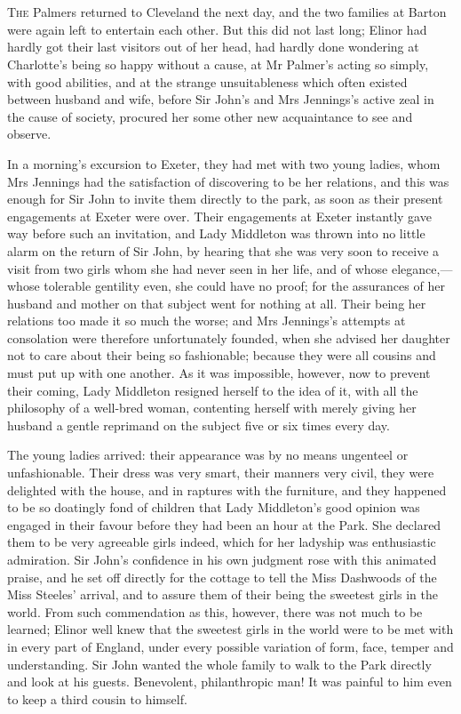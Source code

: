 \chapter[Chapter \thechapter]{}
\lettrine[lines=4,lraise=0.3]{T}{he} Palmers returned to Cleveland the next day, and the two families at Barton were again left to entertain each other. But this did not last long; Elinor had hardly got their last visitors out of her head, had hardly done wondering at Charlotte’s being so happy without a cause, at Mr Palmer’s acting so simply, with good abilities, and at the strange unsuitableness which often existed between husband and wife, before Sir John’s and Mrs Jennings’s active zeal in the cause of society, procured her some other new acquaintance to see and observe.

In a morning’s excursion to Exeter, they had met with two young ladies, whom Mrs Jennings had the satisfaction of discovering to be her relations, and this was enough for Sir John to invite them directly to the park, as soon as their present engagements at Exeter were over. Their engagements at Exeter instantly gave way before such an invitation, and Lady Middleton was thrown into no little alarm on the return of Sir John, by hearing that she was very soon to receive a visit from two girls whom she had never seen in her life, and of whose elegance,—whose tolerable gentility even, she could have no proof; for the assurances of her husband and mother on that subject went for nothing at all. Their being her relations too made it so much the worse; and Mrs Jennings’s attempts at consolation were therefore unfortunately founded, when she advised her daughter not to care about their being so fashionable; because they were all cousins and must put up with one another. As it was impossible, however, now to prevent their coming, Lady Middleton resigned herself to the idea of it, with all the philosophy of a well-bred woman, contenting herself with merely giving her husband a gentle reprimand on the subject five or six times every day.

The young ladies arrived: their appearance was by no means ungenteel or unfashionable. Their dress was very smart, their manners very civil, they were delighted with the house, and in raptures with the furniture, and they happened to be so doatingly fond of children that Lady Middleton’s good opinion was engaged in their favour before they had been an hour at the Park. She declared them to be very agreeable girls indeed, which for her ladyship was enthusiastic admiration. Sir John’s confidence in his own judgment rose with this animated praise, and he set off directly for the cottage to tell the Miss Dashwoods of the Miss Steeles’ arrival, and to assure them of their being the sweetest girls in the world. From such commendation as this, however, there was not much to be learned; Elinor well knew that the sweetest girls in the world were to be met with in every part of England, under every possible variation of form, face, temper and understanding. Sir John wanted the whole family to walk to the Park directly and look at his guests. Benevolent, philanthropic man! It was painful to him even to keep a third cousin to himself.

